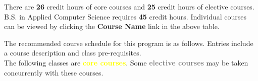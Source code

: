 \documentclass{article}
\begin{document}
\newline \noindent
There are \textbf{26} credit hours of core courses and \textbf{25} credit hours of elective courses. B.S. in Applied Computer Science requires \textbf{45} credit hours. Individual courses can be viewed by clicking the \textbf{Course Name} link in the above table. \newline

\noindent The recommended course schedule for this program is as follows. Entries include a course description and class pre-requisites.  \\

\noindent The following classes are \textcolor{yellow}{\textbf{core courses}}. Some \textcolor{gray}{\textbf{elective courses}} may be taken concurrently with these courses. \\
\end{document}
